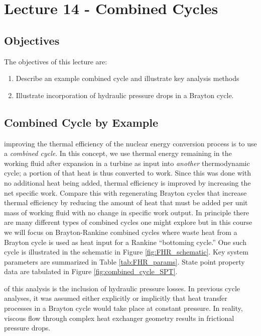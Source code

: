 \chapter{Lecture 14 - Combined Cycles}
\label{ch:ch14}
\section{Objectives}
The objectives of this lecture are:
\begin{enumerate}
\item Describe an example combined cycle and illustrate key analysis methods
\item Illustrate incorporation of hydraulic pressure drops in a Brayton cycle.
\end{enumerate}

\section{Combined Cycle by Example}
 improving the thermal efficiency of the nuclear energy conversion process is to use a \emph{combined cycle}.  In this concept, we use thermal energy remaining in the working fluid after expansion in a turbine as input into \emph{another} thermodynamic cycle; a portion of that heat is thus converted to work.  Since this was done with no additional heat being added, thermal efficiency is improved by increasing the net specific work.  Compare this with regenerating Brayton cycles that increase thermal efficiency by reducing the amount of heat that must be added per unit mass of working fluid with no change in specific work output.  In principle there are many different types of combined cycles one might explore but in this course we will focus on Brayton-Rankine combined cycles where waste heat from a Brayton cycle is used as heat input for a Rankine ``bottoming cycle.''  One such cycle\cite{forsberg2014meeting} is illustrated in the schematic in Figure \ref{fig:FHR_schematic}.  Key system parameters are summarized in Table \ref{tab:FHR_params}.  State point property data are tabulated in Figure \ref{fig:combined_cycle_SPT}.

 of this analysis is the inclusion of hydraulic pressure losses.  In previous cycle analyses, it was assumed either explicitly or implicitly that heat transfer processes in a Brayton cycle would take place at constant pressure.  In reality, viscous flow through complex heat exchanger geometry results in frictional pressure drops.  



